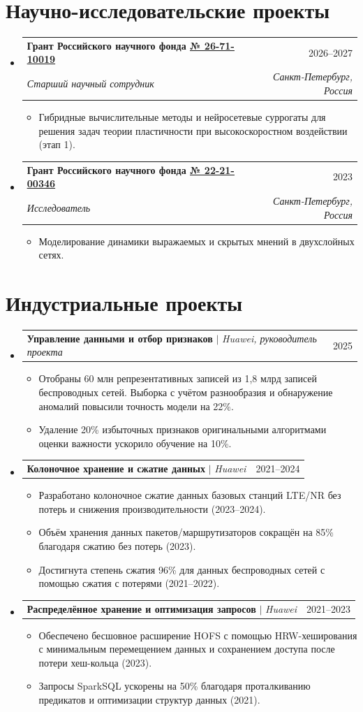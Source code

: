 \documentclass[letterpaper,10pt]{article}
\makeatletter
\newcommand{\link}[2]{\href{#1}{\color{blue}\underline{#2}}}
\newcommand{\resumeItem}[1]{
  \item\small{
    {#1 \vspace{-2pt}}
  }
}
\newcommand{\resumeSubheading}[4]{
  \vspace{-2pt}\item
  \begin{tabular*}{0.97\textwidth}[t]{l@{\extracolsep{\fill}}r}
    \textbf{#1} & #2 \\
    \textit{\small#3} & \textit{\small #4} \\
  \end{tabular*}\vspace{-7pt}
}
\newcommand{\resumeProjectHeading}[2]{
  \item
  \begin{tabular*}{0.97\textwidth}{l@{\extracolsep{\fill}}r}
    \small#1 & #2 \\
  \end{tabular*}\vspace{-7pt}
}
\newenvironment{resumeSubHeadingList}{\begin{itemize}[leftmargin=0.15in, label={}]}{\end{itemize}}
\newenvironment{resumeItemList}{\begin{itemize}}{\end{itemize}}
\makeatother
\begin{document}
\section{Научно-исследовательские проекты}
\begin{resumeSubHeadingList}
  \resumeSubheading
    {Грант Российского научного фонда \link{https://rscf.ru/project/26-71-10019/}{№ 26-71-10019}}{2026--2027}
    {Старший научный сотрудник}{Санкт-Петербург, Россия}
    \begin{resumeItemList}
      \resumeItem{Гибридные вычислительные методы и нейросетевые суррогаты для решения задач теории пластичности при высокоскоростном воздействии (этап 1).}
    \end{resumeItemList}
  \resumeSubheading
    {Грант Российского научного фонда \link{https://rscf.ru/en/project/22-21-00346/}{№ 22-21-00346}}{2023}
    {Исследователь}{Санкт-Петербург, Россия}
    \begin{resumeItemList}
      \resumeItem{Моделирование динамики выражаемых и скрытых мнений в двухслойных сетях.}
    \end{resumeItemList}
\end{resumeSubHeadingList}

\section{Индустриальные проекты}
\begin{resumeSubHeadingList}
  \resumeProjectHeading{
    \textbf{Управление данными и отбор признаков} $|$ \emph{Huawei, руководитель проекта}}{2025}
  \begin{resumeItemList}
    \resumeItem{Отобраны 60 млн репрезентативных записей из 1,8 млрд записей беспроводных сетей. Выборка с учётом разнообразия и обнаружение аномалий повысили точность модели на 22\%.}
    \resumeItem{Удаление 20\% избыточных признаков оригинальными алгоритмами оценки важности ускорило обучение на 10\%.}
  \end{resumeItemList}
  \resumeProjectHeading{
    \textbf{Колоночное хранение и сжатие данных} $|$ \emph{Huawei}}{2021--2024}
  \begin{resumeItemList}
    \resumeItem{Разработано колоночное сжатие данных базовых станций LTE/NR без потерь и снижения производительности (2023--2024).}
    \resumeItem{Объём хранения данных пакетов/маршрутизаторов сокращён на 85\% благодаря сжатию без потерь (2023).}
    \resumeItem{Достигнута степень сжатия 96\% для данных беспроводных сетей с помощью сжатия с потерями (2021--2022).}
  \end{resumeItemList}
  \resumeProjectHeading{
    \textbf{Распределённое хранение и оптимизация запросов} $|$ \emph{Huawei}}{2021--2023}
  \begin{resumeItemList}
    \resumeItem{Обеспечено бесшовное расширение HOFS с помощью HRW-хеширования с минимальным перемещением данных и сохранением доступа после потери хеш-кольца (2023).}
    \resumeItem{Запросы SparkSQL ускорены на 50\% благодаря проталкиванию предикатов и оптимизации структур данных (2021).}
  \end{resumeItemList}
\end{resumeSubHeadingList}
\end{document}
